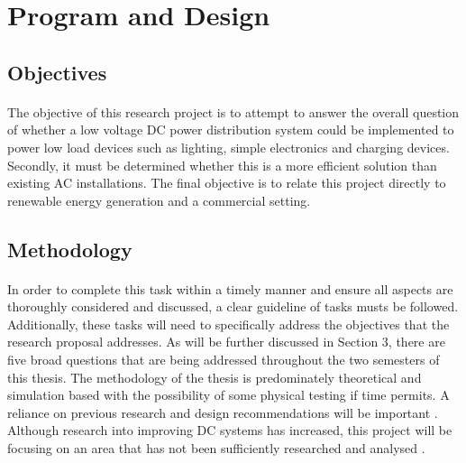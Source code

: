 \section{Program and Design}  


\subsection{Objectives}

\paragraph{}
The objective of this research project is to attempt to answer the overall question of whether a low voltage DC power distribution system could be implemented to power low load devices such as lighting, simple electronics and charging devices. Secondly, it must be determined whether this is a more efficient solution than existing AC installations. The final objective is to relate this project directly to renewable energy generation and a commercial setting.

\subsection{Methodology}

\paragraph{}
In order to complete this task within a timely manner and ensure all aspects are thoroughly considered and discussed, a clear guideline of tasks musts be followed. Additionally, these tasks will need to specifically address the objectives that the research proposal addresses. As will be further discussed in Section 3, there are five broad questions that are being addressed throughout the two semesters of this thesis. The methodology of the thesis is predominately theoretical and simulation based with the possibility of some physical testing if time permits. A reliance on previous research and design recommendations will be important \cite{Amin2011}. Although research into improving DC systems has increased, this project will be focusing on an area that has not been sufficiently researched and analysed \cite{Pellis1997}.   

